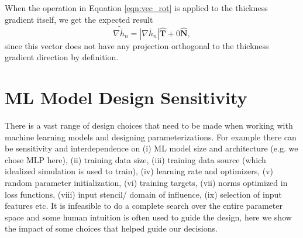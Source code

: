 \documentclass[draft]{agujournal2019}
\begin{document}
When the operation in Equation \ref{eqn:vec_rot} is applied to the thickness gradient itself, we get the expected result 
\begin{equation}
    \widetilde{\nabla \overline{h}_n} = |\nabla \overline{h}_n| \hat{\mathbf{T}} + 0 \hat{\mathbf{N}},
\end{equation}
since this vector does not have any projection orthogonal to the thickness gradient direction by definition.





\section{ML Model Design Sensitivity}
\label{app:ML_model_sensitivity}
There is a vast range of design choices that need to be made when working with machine learning models and designing parameterizations. For example there can be sensitivity and interdependence on (i) ML model size and architecture (e.g. we chose MLP here), (ii) training data size, (iii) training data source (which idealized simulation is used to train), (iv) learning rate and optimizers, (v) random parameter initialization, (vi) training targets, (vii) norms optimized in loss functions, (viii) input stencil/ domain of influence, (ix) selection of input features etc. It is infeasible to do a complete search over the entire parameter space and some human intuition is often used to guide the design, here we show the impact of some choices that helped guide our decisions. 
\end{document}
